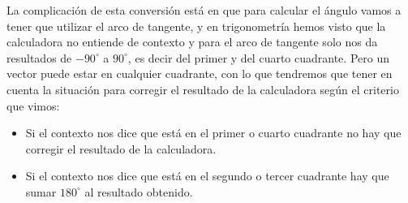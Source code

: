 \documentclass[a4paper,11pt,answers]{exam}
\newcommand{\degree}{^\circ}
\begin{document}
La complicación de esta conversión está en que para calcular el ángulo vamos a tener que utilizar
el arco de tangente, y en trigonometría hemos visto que la calculadora no entiende de contexto y
para el arco de tangente solo nos da resultados de $-90\degree$ a $90\degree$, es decir del primer
y del cuarto cuadrante. Pero un vector puede estar en cualquier cuadrante, con lo que tendremos que
tener en cuenta la situación para corregir el resultado de la calculadora según el criterio
que vimos:
\begin{itemize}
\item Si el contexto nos dice que está en el primer o cuarto cuadrante no hay que corregir
  el resultado de la calculadora.
\item Si el contexto nos dice que está en el segundo o tercer cuadrante hay que sumar
  $180\degree$ al resultado obtenido.
\end{itemize}
\end{document}
